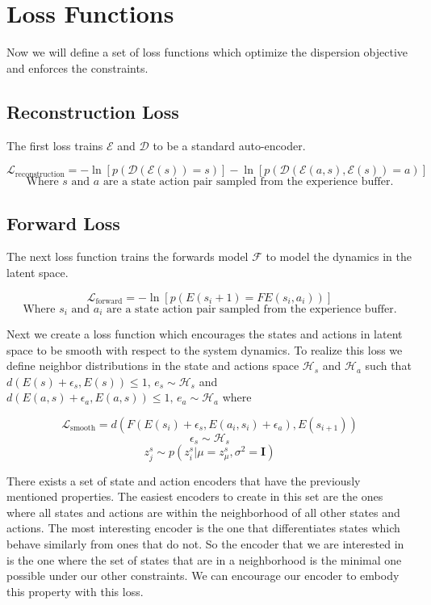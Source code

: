 \documentclass{article}
\begin{document}
\section{Loss Functions}

Now we will define a set of loss functions which optimize the dispersion objective and enforces the constraints.

\subsection*{Reconstruction Loss}
The first loss trains $\mathcal{E}$ and $\mathcal{D}$ to be a standard auto-encoder.

$$\mathcal{L}_\text{reconstruction} = -\ln[p(\mathcal{D}(\mathcal{E}(s)) = s)] - \ln[p(\mathcal{D}(\mathcal{E}(a, s), \mathcal{E}(s)) = a)]$$
$$\text{Where } s \text{ and } a \text{ are a state action pair sampled from the experience buffer.}$$

\subsection*{Forward Loss}
The next loss function trains the forwards model $\mathcal{F}$ to model the dynamics in the latent space.

$$\mathcal{L}_{\text{forward}} = -\ln[p(E(s_i+1) = FE(s_i, a_i))]$$
$$\text{Where } s_i \text{ and } a_i \text{ are a state action pair sampled from the experience buffer.}$$


Next we create a loss function which encourages the states and actions in latent space to be smooth with respect to the system dynamics.
To realize this loss we define neighbor distributions in the state and actions space $\mathcal{H}_s$ and $\mathcal{H}_a$ such that $d(E(s) + \epsilon_s, E(s)) \leq 1 \text{, } e_s \sim \mathcal{H}_s$ and $d(E(a, s) + \epsilon_a, E(a, s)) \leq 1 \text{, } e_a \sim \mathcal{H}_a$ where


$$\mathcal{L}_\text{smooth} = d(F(E(s_i) + \epsilon_s, E(a_i, s_i) + \epsilon_a), E(s_{i+1}))$$
$$\epsilon_s \sim \mathcal{H}_s$$
$$z^s_j \sim p(z^s_i | \mu=z^s_\mu, \sigma^2=\mathbf{I})$$


There exists a set of state and action encoders that have the previously mentioned properties.
The easiest encoders to create in this set are the ones where all states and actions are within the neighborhood of all other states and actions.
The most interesting encoder is the one that differentiates states which behave similarly from ones that do not.
So the encoder that we are interested in is the one where the set of states that are in a neighborhood is the minimal one possible under our other constraints.
We can encourage our encoder to embody this property with this loss.
\end{document}
